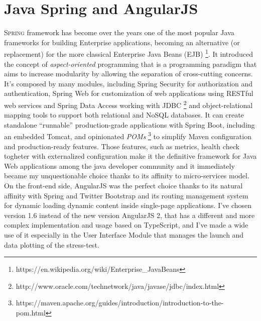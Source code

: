\section{Java Spring and AngularJS}
\label{sec:3}
\textsc{Spring} framework has become over the years one of the most popular Java frameworks for building  Enterprise applications, becoming an alternative (or replacement) for the more classical Enterprise Java Beans (EJB)  \footnote{https://en.wikipedia.org/wiki/Enterprise\_JavaBeans}. It introduced the concept of \textit{aspect-oriented} programming that is a programming paradigm that aims to increase modularity by allowing the separation of cross-cutting concerns. It’s composed by many modules, including Spring Security for authorization and authentication, Spring Web for customization of web applications using RESTful web services and Spring Data Access working with \textsc{JDBC} \footnote{http://www.oracle.com/technetwork/java/javase/jdbc/index.html} and object-relational mapping tools to support both relational and NoSQL databases. 
It can create standalone “runnable” production-grade applications with Spring Boot, including an embedded Tomcat, and opinionated \textit{POMs} \footnote{https://maven.apache.org/guides/introduction/introduction-to-the-pom.html} to simplify Maven configuration and production-ready features.
Those features, such as metrics, health check togheter with externalized configuration make it the definitive framework for Java Web applications among the java developer community and  it immediately became my unquestionable choice thanks to its affinity to micro-services model.
On the front-end side, AngularJS was the perfect choice thanks to its natural affinity with Spring and Twitter Bootstrap and its routing management system for dynamic loading dynamic content inside single-page applications. I’ve chosen version 1.6 instead of the new version AngularJS 2, that has a different and more complex implementation and usage based on TypeScript, and I’ve made a wide use of it especially in the User Interface Module that manages the launch and data plotting  of the stress-test.

